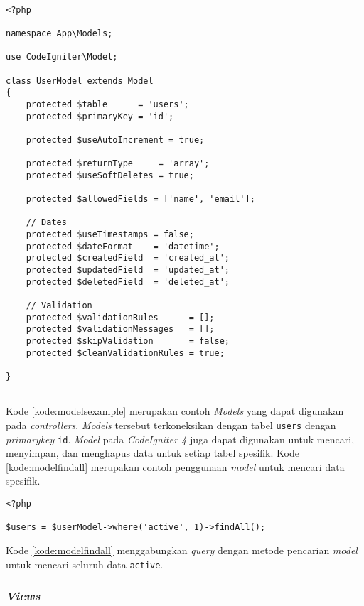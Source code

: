 \begin{lstlisting}[caption=Contoh \textit{Models},label=kode:modelsexample]

<?php

namespace App\Models;

use CodeIgniter\Model;

class UserModel extends Model
{
    protected $table      = 'users';
    protected $primaryKey = 'id';

    protected $useAutoIncrement = true;

    protected $returnType     = 'array';
    protected $useSoftDeletes = true;

    protected $allowedFields = ['name', 'email'];

    // Dates
    protected $useTimestamps = false;
    protected $dateFormat    = 'datetime';
    protected $createdField  = 'created_at';
    protected $updatedField  = 'updated_at';
    protected $deletedField  = 'deleted_at';

    // Validation
    protected $validationRules      = [];
    protected $validationMessages   = [];
    protected $skipValidation       = false;
    protected $cleanValidationRules = true;

}
    
\end{lstlisting}

Kode \ref{kode:modelsexample} merupakan contoh \textit{Models} yang dapat digunakan pada \textit{controllers}. \textit{Models} tersebut terkoneksikan dengan tabel \texttt{users} dengan \textit{primarykey} \texttt{id}. \textit{Model} pada \textit{CodeIgniter 4} juga dapat digunakan untuk mencari, menyimpan, dan menghapus data untuk setiap tabel spesifik. Kode \ref{kode:modelfindall} merupakan contoh penggunaan \textit{model} untuk mencari data spesifik.
\begin{lstlisting}[caption=Contoh penggunaan \textit{model} untuk mencari data spesifik,label=kode:modelfindall]
<?php

$users = $userModel->where('active', 1)->findAll();
\end{lstlisting}

Kode \ref{kode:modelfindall} menggabungkan \textit{query} dengan metode pencarian \textit{model} untuk mencari seluruh data \verb|active|.

\subsubsection{\textit{Views}}

